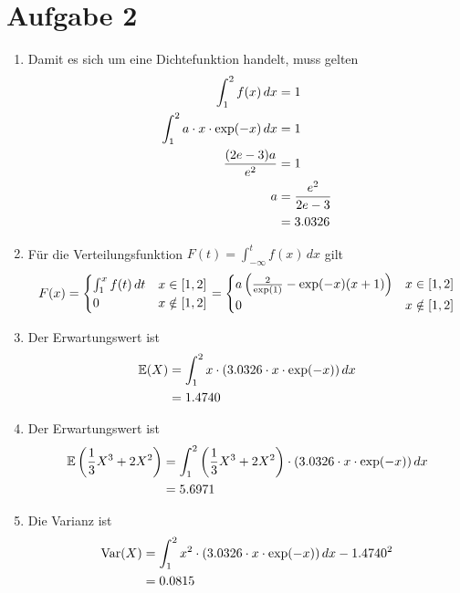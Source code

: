 \documentclass{article}
\DeclareMathOperator{\Var}{Var}
\newcommand{\E}{\mathbb{E}}
\begin{document}
	\section*{Aufgabe 2}
	\begin{enumerate}[label=(\alph*)]
		\item Damit es sich um eine Dichtefunktion handelt, muss gelten
		\begin{align}
			\int_1^2 f(x) \,dx &= 1 \notag \\
			\int_1^2 a\cdot x\cdot\exp(-x)\,dx &= 1 \notag \\
			\frac{(2e-3)a}{e^2} &= 1 \notag \\
			a &= \frac{e^2}{2e-3} \notag \\
			&= 3.0326 \notag
		\end{align}
		\item Für die Verteilungsfunktion $F(t) = \int_{-\infty}^t f(x)\, dx$ gilt
		\begin{align}
			F(x) = \begin{cases}
				\int_1^x f(t)\, dt & x\in [1,2] \\
				0 & x\notin [1,2]
			\end{cases} = \begin{cases}
				a\left(\frac{2}{\exp(1)}-\exp(-x)(x+1)\right) & x\in [1,2] \\
				0 & x\notin [1,2]
			\end{cases} \notag
		\end{align}
		\item Der Erwartungswert ist
		\begin{align}
			\E(X) &= \int_1^2 x\cdot(3.0326\cdot x\cdot\exp(-x)) \,dx \notag \\
			&= 1.4740 \notag
		\end{align}
		\item Der Erwartungswert ist
		\begin{align}
			\E\left(\frac{1}{3}X^3 + 2X^2\right) &= \int_1^2 \left(\frac{1}{3}X^3 + 2X^2\right)\cdot (3.0326\cdot x\cdot\exp(-x)) \,dx \notag \\
			&= 5.6971 \notag
		\end{align}
		\item Die Varianz ist
		\begin{align}
			\Var(X) &= \int_1^2 x^2\cdot (3.0326\cdot x\cdot\exp(-x))\, dx - 1.4740^2 \notag \\
			&= 0.0815 \notag
		\end{align}
	\end{enumerate}
\end{document}
